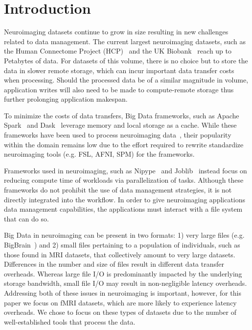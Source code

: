   \section{Introduction}\label{sec:sea_neuro:introduction}
    
    Neuroimaging datasets continue to grow in size resulting in new challenges
    related to data management. The current largest neuroimaging datasets, such
    as the Human Connectome Project (HCP)~\cite{HCP} and the UK
    Biobank~\cite{ukbiobank} reach up to Petabytes of data. For datasets of this
    volume, there is no choice but to store the data in slower remote storage,
    which can incur important data transfer costs when processing.
    Should the processed data be of a similar magnitude in volume, application
    writes will also need to be made to compute-remote storage thus further
    prolonging application makespan. 

    To minimize the costs of data transfers, Big Data frameworks, such as Apache
    Spark~\cite{zaharia2016apache} and Dask~\cite{rocklin2015dask} leverage
    memory and local storage as a cache. While these frameworks have been used
    to process neuroimaging data~\cite{rokem2021pan,thunder,boubela2016big}, their popularity within the
    domain remains low due to the effort required to rewrite standardize
    neuroimaging tools (e.g. FSL, AFNI, SPM) for the frameworks. 
    
    Frameworks used in neuroimaging, such as Nipype~\cite{nipype} and
    Joblib~\cite{joblib} instead focus on reducing compute time of workloads via parallelization of tasks.
    Although these
    frameworks do not prohibit the use of data management strategies, it is not
    directly integrated into the workflow. In order to give neuroimaging
    applications data management capabilities, the applications must interact
    with a file system that can do so.

    Big Data in neuroimaging can be present in two formats: 1) very large files
    (e.g. BigBrain~\cite{amunts2013bigbrain}) and 2) small files pertaining to a
    population of individuals, such as those found in MRI datasets, that
    collectively amount to very large datasets. Differences in the number and size
    of files result in different data transfer overheads. Whereas large file I/O
    is predominantly impacted by the underlying storage bandwidth, small file
    I/O may result in non-negligible latency overheads. Addressing both of these
    issues in neuroimaging is important, however, for this paper we focus on
    fMRI datasets, which are more likely to experience latency
    overheads. We chose to focus on these types of datasets due to the number of
    well-established tools that process the data.

